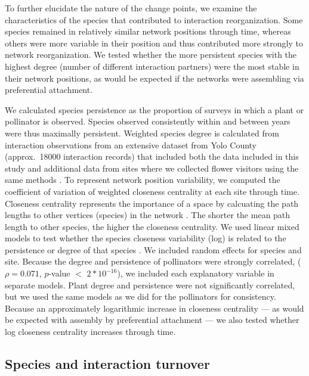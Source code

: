 \documentclass[12pt]{article}
\begin{document}
To further elucidate the nature of the change points, we examine the
characteristics of the species that contributed to interaction
reorganization. Some species remained in relatively similar network
positions through time, whereas others were more variable in their
position and thus contributed more strongly to network
reorganization. We tested whether the more persistent species with the
highest degree (number of different interaction partners) were the
most stable in their network positions, as would be expected if the
networks were assembling via preferential attachment.

We calculated species persistence as the proportion of surveys in
which a plant or pollinator is observed. Species observed consistently
within and between years were thus maximally persistent. Weighted
species degree is calculated from interaction observations from an
extensive dataset from Yolo County (approx.~18000 interaction records)
that included both the data included in this study and additional data
from sites where we collected flower visitors using the same methods
\citep{mgonigle-2015-x, ponisio2015farm}. To represent network
position variability, we computed the coefficient of variation of
weighted closeness centrality \citep{freeman1978centrality} at each
site through time. Closeness centrality represents the importance of a
space by calcuating the path lengths to other vertices (species) in
the network \citep{freeman1978centrality}. The shorter the mean path
length to other species, the higher the closeness centrality. We used
linear mixed models to test whether the species closeness variability
(log) is related to the persistence or degree of that species
\citep{lme4, lmetest}. We included random effects for species and
site. Because the degree and persistence of pollinators were strongly
correlated, ($\rho = 0.071$, $p$-value $<$ $2*10^{-16}$), we included
each explanatory variable in separate models. Plant degree and
persistence were not significantly correlated, but we used the same
models as we did for the pollinators for consistency.  Because an
approximately logarithmic increase in closeness centrality --- as
would be expected with assembly by preferential attachment --- we also
tested whether log closeness centrality increases through time.

\subsection*{Species and interaction turnover}
\end{document}
